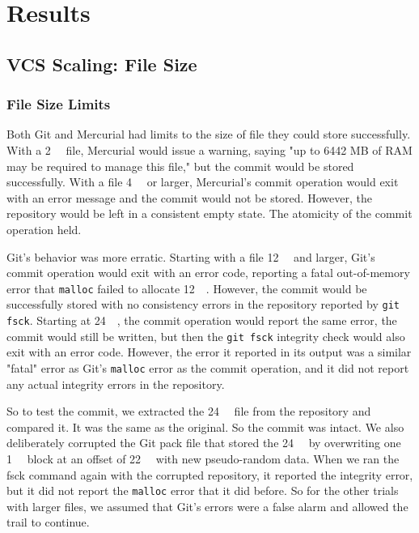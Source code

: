 \chapter{Results}

\section{VCS Scaling: File Size}

\subsection{File Size Limits}

Both Git and Mercurial had limits to the size of file they could store
successfully. With a \SI{2}{\gibi\byte} file, Mercurial would issue a warning,
saying "up to 6442 MB of RAM may be required to manage this file," but the
commit would be stored successfully. With a file \SI{4}{\gibi\byte} or larger,
Mercurial's commit operation would exit with an error message and the commit
would not be stored. However, the repository would be left in a consistent empty
state. The atomicity of the commit operation held.

Git's behavior was more erratic. Starting with a file \SI{12}{\gibi\byte} and
larger, Git's commit operation would exit with an error code, reporting a fatal
out-of-memory error that \lstinline{malloc} failed to allocate
\SI{12}{\gibi\byte}. However, the commit would be successfully stored with no
consistency errors in the repository reported by \lstinline{git fsck}. Starting
at \SI{24}{\gibi\byte}, the commit operation would report the same error, the
commit would still be written, but then the \lstinline{git fsck} integrity check
would also exit with an error code. However, the error it reported in its output
was a similar "fatal" error as Git's \lstinline{malloc} error as the commit
operation, and it did not report any actual integrity errors in the repository.

So to test the commit, we extracted the \SI{24}{\gibi\byte} file from the
repository and compared it. It was the same as the original. So the commit was
intact. We also deliberately corrupted the Git pack file that stored the
\SI{24}{\gibi\byte} by overwriting one \SI{1}{\mebi\byte} block at an offset of
\SI{22}{\gibi\byte} with new pseudo-random data. When we ran the fsck command
again with the corrupted repository, it reported the integrity error, but it did
not report the \lstinline{malloc} error that it did before. So for the other
trials with larger files, we assumed that Git's errors were a false alarm and
allowed the trail to continue.

